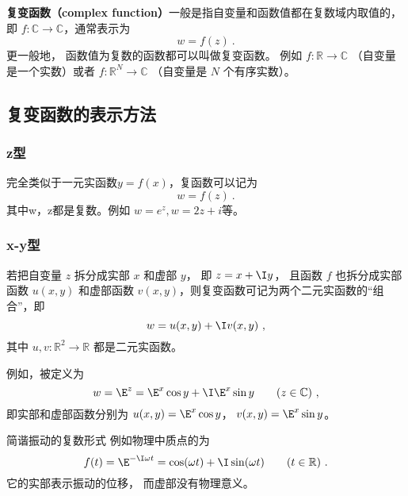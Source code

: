 
\begin{issues}
\issueTODO
\end{issues}

\textbf{复变函数（complex function）}一般是指自变量和函数值都在复数域内取值的，即 $f:\mathbb C \to \mathbb C$，通常表示为
\begin{equation}
w = f(z)~.
\end{equation}
更一般地， 函数值为复数的函数都可以叫做复变函数。 例如 $f: \mathbb R \to \mathbb C$ （自变量是一个实数）或者 $f:\mathbb R^N \to \mathbb C$ （自变量是 $N$ 个有序实数）。

\subsection{复变函数的表示方法}
\subsubsection{z型}
完全类似于一元实函数$y=f(x)$，复函数可以记为
\begin{equation}
w = f(z)~.
\end{equation}
其中w，z都是复数。例如 $w=e^z, w=2z+i$等。

\subsubsection{x-y型}
若把自变量 $z$ 拆分成实部 $x$ 和虚部 $y$， 即 $z = x + \I y$， 且函数 $f$ 也拆分成实部函数 $u(x,y)$ 和虚部函数 $v(x,y)$，则复变函数可记为两个二元实函数的“组合”，即
\begin{equation}\label{eq_Cplx_1}
w = u(x,y) + \I v(x,y)~,
\end{equation}
其中 $u, v: \mathbb R^2 \to \mathbb R$ 都是二元实函数。 

例如，被定义为
\begin{equation}\label{eq_Cplx_3}
w = \E^z = \E^x \cos y + \I \E^x\sin y \qquad (z \in \mathbb C)~,
\end{equation}
即实部和虚部函数分别为 $u(x, y) = \E^x \cos y$， $v(x, y) = \E^x \sin y$。

\begin{example}{简谐振动的复数形式}
例如物理中质点的为
\begin{equation}
f(t) = \E^{-\I \omega t} = \cos(\omega t) + \I \sin(\omega t) \qquad (t \in \mathbb R)~.
\end{equation}
它的实部表示振动的位移， 而虚部没有物理意义。
\end{example}


